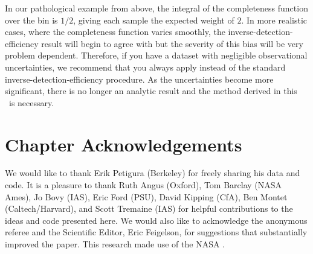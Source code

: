 In our pathological example from above, the integral of the completeness
function over the bin is $1/2$, giving each sample the expected weight of $2$.
In more realistic cases, where the completeness function varies smoothly, the
inverse-detection-efficiency result will begin to agree with  but
the severity of this bias will be very problem dependent.
Therefore, if you have a dataset with negligible observational uncertainties,
we recommend that you always apply  instead of the standard
inverse-detection-efficiency procedure.
As the uncertainties become more significant, there is no longer an analytic
result and the method derived in this \paper\ is necessary.

\section{Chapter Acknowledgements}

We would like to thank Erik Petigura (Berkeley) for freely sharing his data
and code.
It is a pleasure to thank
Ruth Angus (Oxford),
Tom Barclay (NASA Ames),
Jo Bovy (IAS),
Eric Ford (PSU),
David Kipping (CfA),
Ben Montet (Caltech/Harvard), and
Scott Tremaine (IAS)
for helpful contributions to the ideas and code presented here.
We would also like to acknowledge the anonymous referee and the Scientific
Editor, Eric Feigelson, for suggestions that
substantially improved the paper.
This research made use of the NASA .
